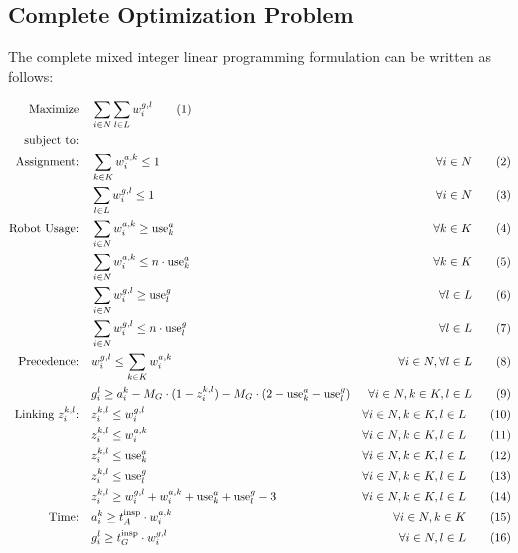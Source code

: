 \documentclass{article}
\begin{document}
		\subsection{Complete Optimization Problem}

		The complete mixed integer linear programming formulation can be written as follows:

		{\small
		\begin{align}
		\text{Maximize} \quad & \sum_{i \in N}\sum_{l \in L} w_i^{g,l} \tag{1} \\
		\text{subject to:} \quad & \notag \\
		\text{Assignment:} \quad & \sum_{k \in K} w_i^{a,k} \leq 1 & \forall i \in N \tag{2} \\
		& \sum_{l \in L} w_i^{g,l} \leq 1 & \forall i \in N \tag{3} \\
		\text{Robot Usage:} \quad & \sum_{i \in N} w_i^{a,k} \geq \text{use}_k^a & \forall k \in K \tag{4} \\
		& \sum_{i \in N} w_i^{a,k} \leq n \cdot \text{use}_k^a & \forall k \in K \tag{5} \\
		& \sum_{i \in N} w_i^{g,l} \geq \text{use}_l^g & \forall l \in L \tag{6} \\
		& \sum_{i \in N} w_i^{g,l} \leq n \cdot \text{use}_l^g & \forall l \in L \tag{7} \\
		\text{Precedence:} \quad & w_i^{g,l} \leq \sum_{k \in K} w_i^{a,k} & \forall i \in N, \forall l \in L \tag{8} \\
		& g_i^l \geq a_i^k - M_G \cdot (1 - z_i^{k,l}) - M_G \cdot (2 - \text{use}_k^a - \text{use}_l^g) & \forall i \in N, k \in K, l \in L \tag{9} \\
		\text{Linking $z_i^{k,l}$:} \quad & z_i^{k,l} \leq w_i^{g,l} & \forall i \in N, k \in K, l \in L \tag{10} \\
		& z_i^{k,l} \leq w_i^{a,k} & \forall i \in N, k \in K, l \in L \tag{11} \\
		& z_i^{k,l} \leq \text{use}_k^a & \forall i \in N, k \in K, l \in L \tag{12} \\
		& z_i^{k,l} \leq \text{use}_l^g & \forall i \in N, k \in K, l \in L \tag{13} \\
		& z_i^{k,l} \geq w_i^{g,l} + w_i^{a,k} + \text{use}_k^a + \text{use}_l^g - 3 & \forall i \in N, k \in K, l \in L \tag{14} \\
		\text{Time:} \quad & a_i^k \geq t_A^{\text{insp}} \cdot w_i^{a,k} & \forall i \in N, k \in K \tag{15} \\
		& g_i^l \geq t_G^{\text{insp}} \cdot w_i^{g,l} & \forall i \in N, l \in L \tag{16} \\

\end{align}}
\end{document}
